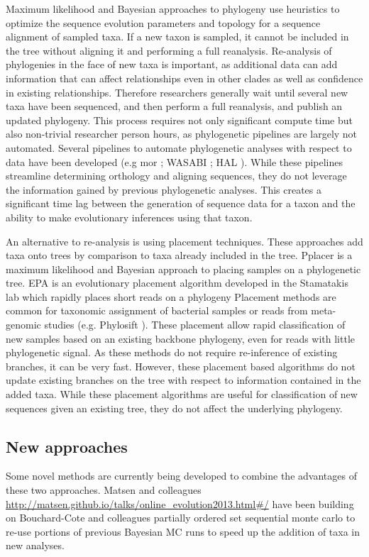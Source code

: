 \documentclass[10pt]{article}
\begin{document}
Maximum likelihood and Bayesian approaches to phylogeny use heuristics to optimize the sequence evolution parameters and topology for a sequence alignment of sampled taxa. 
If a new taxon is sampled, it cannot be included in the tree without aligning it and performing a full reanalysis. 
Re-analysis of phylogenies in the face of new taxa is important, as additional data can add information that can affect relationships even in other clades as well as confidence in existing relationships. 
Therefore researchers generally wait until several new taxa have been sequenced, and then perform a full reanalysis, and publish an updated phylogeny. 
This process requires not only significant compute time but also non-trivial researcher person hours, as phylogenetic pipelines are largely not automated. 
Several pipelines to automate phylogenetic analyses with respect to data have been developed (e.g mor \cite{hibbett_automated_2005}; WASABI \cite{kauff_WASABI:_2007}; HAL \cite{robbertse_hal:_2011}). 
While these pipelines streamline determining orthology and aligning sequences, they do not leverage the information gained by previous phylogenetic analyses. 
This creates a significant time lag between the generation of sequence data for a taxon and the ability to make evolutionary inferences using that taxon.

An alternative to re-analysis is using placement techniques. 
These approaches add taxa onto trees by comparison to taxa already included in the tree. 
Pplacer \cite{matsen_pplacer:_2010} is a maximum likelihood and Bayesian approach to placing samples on a phylogenetic tree. 
EPA is an evolutionary placement algorithm developed in the Stamatakis lab which rapidly places short reads on a phylogeny\cite{berger_performance_2011}
Placement methods are common for taxonomic assignment of bacterial samples or reads from meta-genomic studies (e.g. 
Phylosift \cite{darling_phylosift:_2014}). 
These placement allow rapid classification of new samples based on an existing backbone phylogeny, even for reads with little phylogenetic signal. 
As these methods do not require re-inference of existing branches, it can be very fast. 
However, these placement based algorithms do not update existing branches on the tree with respect to information contained in the added taxa. 
While these placement algorithms are useful for classification of new sequences given an existing tree, they do not affect the underlying phylogeny.

\subsection*{New approaches}
Some novel methods are currently being developed to combine the advantages of these two approaches. 
Matsen and colleagues \url{http://matsen.github.io/talks/online_evolution2013.html#/} have been building on Bouchard-Cote and colleagues partially ordered set sequential monte carlo \cite{bouchard-cote_phylogenetic_2012} to re-use portions of previous Bayesian MC runs to speed up the addition of taxa in new analyses.
\end{document}
